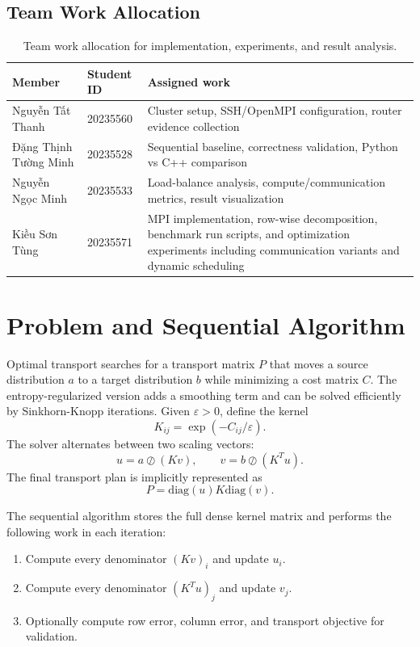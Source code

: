 \documentclass[12pt,a4paper]{article}
\begin{document}
\subsection{Team Work Allocation}

\begin{table}[H]
\centering
\begin{tabularx}{\linewidth}{P{4.6cm}P{3cm}Y}
\toprule
\textbf{Member} & \textbf{Student ID} & \textbf{Assigned work} \\
\midrule
Nguyễn Tất Thanh & 20235560 & Cluster setup, SSH/OpenMPI configuration, router evidence collection \\
Đặng Thịnh Tường Minh & 20235528 & Sequential baseline, correctness validation, Python vs C++ comparison \\
Nguyễn Ngọc Minh & 20235533 & Load-balance analysis, compute/communication metrics, result visualization \\
Kiều Sơn Tùng & 20235571 & MPI implementation, row-wise decomposition, benchmark run scripts, and optimization experiments including communication variants and dynamic scheduling \\
\bottomrule
\end{tabularx}
\caption{Team work allocation for implementation, experiments, and result analysis.}
\end{table}

\section{Problem and Sequential Algorithm}

Optimal transport searches for a transport matrix $P$ that moves a source distribution $a$ to a target distribution $b$ while minimizing a cost matrix $C$. The entropy-regularized version adds a smoothing term and can be solved efficiently by Sinkhorn-Knopp iterations. Given $\varepsilon > 0$, define the kernel
\[
K_{ij} = \exp(-C_{ij}/\varepsilon).
\]
The solver alternates between two scaling vectors:
\[
u = a \oslash (K v), \qquad
v = b \oslash (K^T u).
\]
The final transport plan is implicitly represented as
\[
P = \mathrm{diag}(u)K\mathrm{diag}(v).
\]

The sequential algorithm stores the full dense kernel matrix and performs the following work in each iteration:

\begin{enumerate}
  \item Compute every denominator $(Kv)_i$ and update $u_i$.
  \item Compute every denominator $(K^Tu)_j$ and update $v_j$.
  \item Optionally compute row error, column error, and transport objective for validation.
\end{enumerate}
\end{document}
